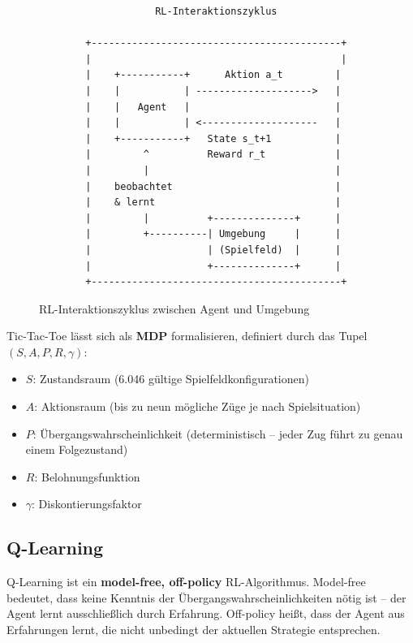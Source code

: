 \begin{figure}[H]
\centering
\begin{verbatim}
                    RL-Interaktionszyklus
                    
        +-------------------------------------------+
        |                                           |
        |    +-----------+      Aktion a_t         |
        |    |           | -------------------->   |
        |    |   Agent   |                         |
        |    |           | <--------------------   |
        |    +-----------+   State s_t+1           |
        |         ^          Reward r_t            |
        |         |                                |
        |    beobachtet                            |
        |    & lernt                               |
        |         |          +--------------+      |
        |         +----------| Umgebung     |      |
        |                    | (Spielfeld)  |      |
        |                    +--------------+      |
        +-------------------------------------------+
\end{verbatim}
\caption{\ac{RL}-Interaktionszyklus zwischen Agent und Umgebung}
\end{figure}

Tic-Tac-Toe lässt sich als \textbf{\ac{MDP}} formalisieren, definiert durch das Tupel $(S, A, P, R, \gamma)$:
\begin{itemize}
    \item $S$: Zustandsraum (6.046 gültige Spielfeldkonfigurationen)
    \item $A$: Aktionsraum (bis zu neun mögliche Züge je nach Spielsituation)
    \item $P$: Übergangswahrscheinlichkeit (deterministisch -- jeder Zug führt zu genau einem Folgezustand)
    \item $R$: Belohnungsfunktion
    \item $\gamma$: Diskontierungsfaktor
\end{itemize}

\subsection{Q-Learning}

Q-Learning ist ein \textbf{model-free, off-policy} \ac{RL}-Algorithmus. \glqq Model-free\grqq{} bedeutet, dass keine Kenntnis der Übergangswahrscheinlichkeiten nötig ist -- der Agent lernt ausschließlich durch Erfahrung. \glqq Off-policy\grqq{} heißt, dass der Agent aus Erfahrungen lernt, die nicht unbedingt der aktuellen Strategie entsprechen.

